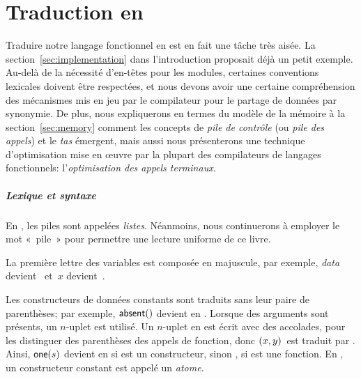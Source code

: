 \chapter{Traduction en \Erlang}

Traduire notre langage fonctionnel en \Erlang est en fait une tâche
très aisée. La section~\ref{sec:implementation} dans l'introduction
proposait déjà un petit exemple. Au-delà de la nécessité d'en-têtes
pour les modules, certaines conventions lexicales doivent être
respectées, et nous devons avoir une certaine compréhension des
mécanismes mis en jeu par le compilateur pour le partage de données
par synonymie. De plus, nous expliquerons en termes du modèle de la
mémoire à la section~\ref{sec:memory} comment les concepts de
\emph{pile de contrôle} (ou \emph{pile des appels}) et le \emph{tas}
émergent, mais aussi nous présenterons une technique d'optimisation
mise en œuvre par la plupart des compilateurs de langages
fonctionnels: l'\emph{optimisation des appels
  terminaux}.

\paragraph{Lexique et syntaxe}

En \Erlang, les piles sont appelées \emph{listes}. Néanmoins, nous
continuerons à employer le mot «~pile~» pour permettre une lecture
uniforme de ce livre.

La première lettre des variables est composée en majuscule, par
exem\-ple, \emph{data} devient~ et~\(x\)
devient~.

Les constructeurs de données constants sont traduits sans leur paire de parenthèses; par
exemple, \(\textsf{absent}()\) devient  en
\Erlang. Lorsque des arguments sont présents, un \(n\)-uplet est
utilisé. Un \(n\)-uplet en \Erlang est écrit avec des accolades, pour
les distinguer des parenthèses des appels de fonction, donc
\(({x},{y})\)~est traduit par . Ainsi,
\(\textsf{one}(s)\) devient  en \Erlang si 
est un constructeur, sinon , si  est
une fonction. En \Erlang, un constructeur constant est appelé un
\emph{atome}.

